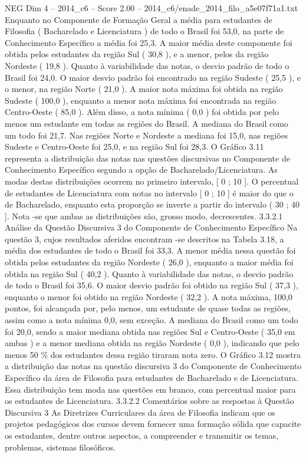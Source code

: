 \begin{textsample}{NEG Dim 4 – 2014\_c6 – Score 2.00 – 2014\_c6/enade\_2014\_filo\_a5e07f71a1.txt}
Enquanto no Componente de Formação Geral a média para estudantes de Filosofia ( Bacharelado e Licenciatura ) de todo o Brasil foi 53,0, na parte de Conhecimento Específico a média foi 25,3.
A maior média deste componente foi obtida pelos estudantes da região Sul ( 30,8 ), e a menor, pelos da região Nordeste ( 19,8 ).
Quanto à variabilidade das notas, o desvio padrão de todo o Brasil foi 24,0.
O maior desvio padrão foi encontrado na região Sudeste ( 25,5 ), e o menor, na região Norte ( 21,0 ).
A maior nota máxima foi obtida na região Sudeste ( 100,0 ), enquanto a menor nota máxima foi encontrada na região Centro-Oeste ( 85,0 ).
Além disso, a nota mínima ( 0,0 ) foi obtida por pelo menos um estudante em todas as regiões do Brasil.
A mediana do Brasil como um todo foi 21,7.
Nas regiões Norte e Nordeste a mediana foi 15,0, nas regiões Sudeste e Centro-Oeste foi 25,0, e na região Sul foi 28,3.
O Gráfico 3.11 representa a distribuição das notas nas questões discursivas no Componente de Conhecimento Específico segundo a opção de Bacharelado/Licenciatura.
As modas destas distribuições ocorrem no primeiro intervalo, [ 0 ; 10 ].
O percentual de estudantes de Licenciatura com notas no intervalo [ 0 ; 10 ] é maior do que o de Bacharelado, enquanto esta proporção se inverte a partir do intervalo ( 30 ; 40 ].
Nota -se que ambas as distribuições são, grosso modo, decrescentes. 3.3.2.1 Análise da Questão Discursiva 3 do Componente de Conhecimento Específico Na questão 3, cujos resultados aferidos encontram -se descritos na Tabela 3.18, a média dos estudantes de todo o Brasil foi 33,3.
A menor média nessa questão foi obtida pelos estudantes da região Nordeste ( 26,0 ), enquanto a maior média foi obtida na região Sul ( 40,2 ).
Quanto à variabilidade das notas, o desvio padrão de todo o Brasil foi 35,6.
O maior desvio padrão foi obtido na região Sul ( 37,3 ), enquanto o menor foi obtido na região Nordeste ( 32,2 ).
A nota máxima, 100,0 pontos, foi alcançada por, pelo menos, um estudante de quase todas as regiões, assim como a nota mínima 0,0, sem exceção.
A mediana do Brasil como um todo foi 20,0, sendo a maior mediana obtida nas regiões Sul e Centro-Oeste ( 35,0 em ambas ) e a menor mediana obtida na região Nordeste ( 0,0 ), indicando que pelo menos 50 \% dos estudantes dessa região tiraram nota zero.
O Gráfico 3.12 mostra a distribuição das notas na questão discursiva 3 do Componente de Conhecimento Específico da área de Filosofia para estudantes de Bacharelado e de Licenciatura.
Essa distribuição tem moda nas questões em branco, com percentual maior para os estudantes de Licenciatura. 3.3.2.2 Comentários sobre as respostas à Questão Discursiva 3 As Diretrizes Curriculares da área de Filosofia indicam que os projetos pedagógicos dos cursos devem fornecer uma formação sólida que capacite os estudantes, dentre outros aspectos, a compreender e transmitir os temas, problemas, sistemas filosóficos.

\end{textsample}

